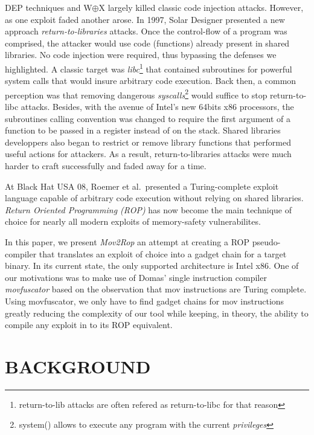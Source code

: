 \documentclass[10pt,twocolumn]{article}
\begin{document}
DEP techniques and W$\oplus$X largely killed classic code injection attacks.
However, as one exploit faded another arose. In 1997, Solar Designer presented
a new approach \textit{return-to-libraries}\cite{solar_returnintolib_1997}
attacks. Once the control-flow of a program was comprised, the attacker would
use code (functions) already present in shared libraries. No code injection
were required, thus bypassing the defenses we highlighted. A classic target was
\textit{libc}\footnote{return-to-lib attacks are often refered as
return-to-libc for that reason} that contained subroutines for powerful
system calls that would insure arbitrary code execution. Back then, a
common perception was that removing dangerous
\textit{syscalls}\footnote{system() allows to execute any program with the
current \textit{privileges}} would suffice to stop return-to-libc attacks.
Besides, with the avenue of Intel's new 64bits x86 processors, the
subroutines calling convention was changed to require the first argument of
a function to be passed in a register instead of on the stack. Shared
libraries developpers also began to restrict or remove library functions
that performed useful actions for attackers. As a result,
return-to-libraries attacks were much harder to craft successfully and
faded away for a time.

At Black Hat USA 08, Roemer et al.\  presented a Turing-complete exploit
language capable of arbitrary code execution without relying on shared
libraries. \textit{Return Oriented Programming
(ROP)}\cite{roemer_return-oriented_2012} has now become the main technique of
choice for nearly all modern exploits of memory-safety vulnerabilites.

In this paper, we present \textit{Mov2Rop} an attempt at creating a ROP
pseudo-compiler that translates an exploit of choice into a gadget chain for a
target binary. In its current state, the only supported architecture is Intel
x86. One of our motivations was to make use of Domas' single instruction
compiler \textit{movfuscator}\cite{domas_movfuscator} based on the observation
that mov instructions are Turing complete\cite{dolan_mov_2013}. Using
movfuscator, we only have to find gadget chains for mov instructions greatly
reducing the complexity of our tool while keeping, in theory, the ability to
compile any exploit in to its ROP equivalent.


\section{BACKGROUND}
\end{document}

